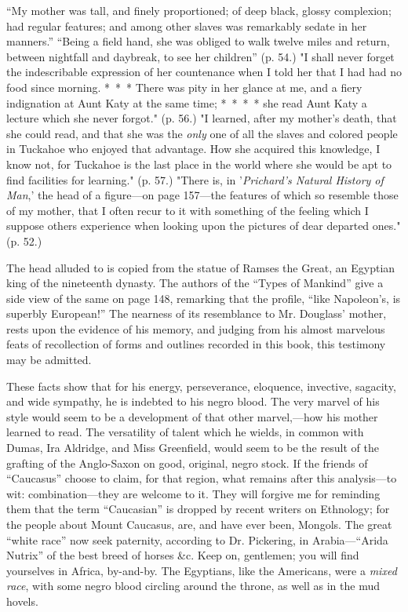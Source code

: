 ``My mother was tall, and finely proportioned; of deep black, glossy
complexion; had regular features; and among other slaves was remarkably
sedate in her manners.'' ``Being a field hand, she was obliged to walk
twelve miles and return, between nightfall and daybreak, to see her
children'' (p. 54.) "I shall never forget the indescribable expression
of her countenance when I told her that I had had no food since morning.
{*~*~*} There was pity in her glance at me, and a fiery indignation at
Aunt Katy at the same time; {*~*~*~*} she read Aunt Katy a lecture which
she never forgot." (p. 56.) "I learned, after my mother's death, that
she could read, and that she was the \emph{only} one of all the slaves
and colored people in Tuckahoe who enjoyed that advantage. How she
acquired this knowledge, I know not, for Tuckahoe is the last place in
the world where she would be apt to find facilities for learning." (p.
57.) "There is, in {'}\emph{Prichard's Natural History of Man},' the
head of a figure---on page 157---the features of which so resemble those
of my mother, that I often recur to it with something of the feeling
which I suppose others experience when looking upon the pictures of dear
departed ones." (p. 52.)

The head alluded to is copied from the statue of Ramses the Great, an
Egyptian king of the nineteenth dynasty. The authors of the ``Types of
Mankind'' give a side view of the same on page 148, remarking that the
profile, ``like Napoleon's, is superbly European!'' The nearness of its
resemblance to Mr. Douglass' mother, rests upon the evidence of his
memory, and judging from his almost marvelous feats of recollection of
forms and outlines recorded in this book, this testimony may be
admitted.

These facts show that for his energy, perseverance, eloquence,
invective, sagacity, and wide sympathy, he is indebted to his negro
blood. The very marvel of his style would seem to be a development of
that other marvel,---how his mother learned to read. The versatility of
talent which he wields, in common with Dumas, Ira Aldridge, and Miss
Greenfield, would seem to be the result of the grafting of the
Anglo-Saxon on good, original, negro stock. If the
{\protect\hypertarget{xxxi}{}{}}friends of ``Caucasus'' choose to claim,
for that region, what remains after this analysis---to wit:
combination---they are welcome to it. They will forgive me for reminding
them that the term ``Caucasian'' is dropped by recent writers on
Ethnology; for the people about Mount Caucasus, are, and have ever been,
Mongols. The great ``white race'' now seek paternity, according to Dr.
Pickering, in Arabia---``Arida Nutrix'' of the best breed of horses \&c.
Keep on, gentlemen; you will find yourselves in Africa, by-and-by. The
Egyptians, like the Americans, were a \emph{mixed race}, with some negro
blood circling around the throne, as well as in the mud hovels.

